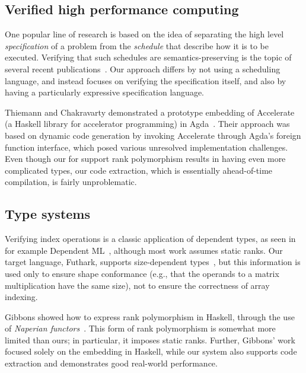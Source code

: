 \subsection{Verified high performance computing}

One popular line of research is based on the idea of separating the
high level \emph{specification} of a problem from the \emph{schedule}
that describe how it is to be executed. Verifying that such schedules
are semantics-preserving is the topic of several recent
publications~\cite{10.1145/3527328,10.1145/3498717}. Our approach
differs by not using a scheduling language, and instead focuses on
verifying the specification itself, and also by having a particularly
expressive specification language.

Thiemann and Chakravarty demonstrated a prototype embedding of
Accelerate~\cite{10.1145/1926354.1926358} (a Haskell library for
accelerator programming) in Agda~\cite{thiemann2013agda}. Their
approach was based on dynamic code generation by invoking Accelerate
through Agda's foreign function interface, which posed various
unresolved implementation challenges. Even though our for support rank
polymorphism results in having even more complicated types, our code
extraction, which is essentially ahead-of-time compilation, is fairly
unproblematic.

\subsection{Type systems}
Verifying index operations is a classic application of dependent
types, as seen in for example Dependent
ML~\cite{10.1145/292540.292560}, although most work assumes static
ranks. Our target language, Futhark, supports size-dependent
types~\cite{10.1145/3609024.3609412}, but this information is used
only to ensure shape conformance (e.g., that the operands to a matrix
multiplication have the same size), not to ensure the correctness of
array indexing.

Gibbons showed how to express rank polymorphism in Haskell, through
the use of \emph{Naperian functors}~\cite{10.1145/2976022.2976023}.
This form of rank polymorphism is somewhat more limited than ours; in
particular, it imposes static ranks. Further, Gibbons' work focused
solely on the embedding in Haskell, while our system also supports
code extraction and demonstrates good real-world performance.
